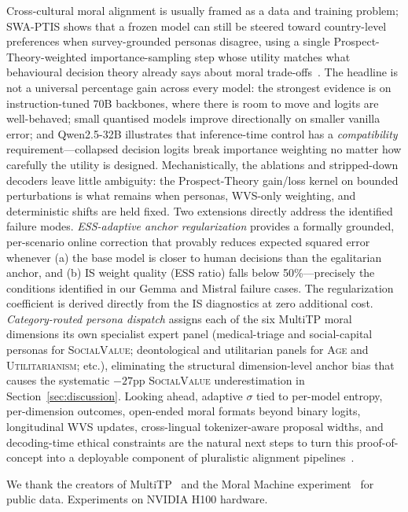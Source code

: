 \documentclass{article}
\begin{document}
Cross-cultural moral alignment is usually framed as a data and training
problem; SWA-PTIS shows that a frozen model can still be steered toward
country-level preferences when survey-grounded personas disagree, using a
single Prospect-Theory-weighted importance-sampling step whose utility matches what
behavioural decision theory already says about moral trade-offs~\citep{kahneman1979prospect}.
The headline is not a universal percentage gain across every model: the
strongest evidence is on instruction-tuned 70B backbones, where there is room
to move and logits are well-behaved; small quantised models improve
directionally on smaller vanilla error; and Qwen2.5-32B illustrates that
inference-time control has a \emph{compatibility} requirement---collapsed
decision logits break importance weighting no matter how carefully the utility
is designed.
Mechanistically, the ablations and stripped-down decoders leave little
ambiguity: the Prospect-Theory gain/loss kernel on bounded perturbations is
what remains when personas, WVS-only weighting, and deterministic shifts are
held fixed.
Two extensions directly address the identified failure modes.
\emph{ESS-adaptive anchor regularization} provides a formally grounded, per-scenario
online correction that provably reduces expected squared error whenever (a) the
base model is closer to human decisions than the egalitarian anchor, and (b) IS
weight quality (ESS ratio) falls below 50\%---precisely the conditions identified
in our Gemma and Mistral failure cases. The regularization coefficient is derived
directly from the IS diagnostics at zero additional cost.
\emph{Category-routed persona dispatch} assigns each of the six MultiTP moral
dimensions its own specialist expert panel (medical-triage and social-capital
personas for \textsc{SocialValue}; deontological and utilitarian panels for
\textsc{Age} and \textsc{Utilitarianism}; etc.), eliminating the structural
dimension-level anchor bias that causes the systematic $-27$pp \textsc{SocialValue}
underestimation in Section~\ref{sec:discussion}.
Looking ahead, adaptive $\sigma$ tied to per-model entropy, per-dimension
outcomes, open-ended moral formats beyond binary logits, longitudinal WVS updates,
cross-lingual tokenizer-aware proposal widths, and decoding-time ethical constraints
are the natural next steps to turn this proof-of-concept into a deployable component
of pluralistic alignment pipelines~\citep{sorensen2024roadmap}.

\begin{ack}
We thank the creators of MultiTP~\citep{jin2025multitp} and the Moral Machine
experiment~\citep{awad2018moral} for public data. Experiments on NVIDIA H100 hardware.
\end{ack}
\end{document}
